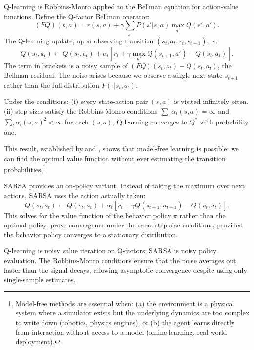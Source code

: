 Q-learning \citep{WatkinsDayan1992} is Robbins-Monro applied to the Bellman equation for action-value functions. Define the Q-factor Bellman operator:
\begin{equation}
(FQ)(s,a) = r(s,a) + \gamma \sum_{s'} P(s'|s,a) \max_{a'} Q(s',a').
\end{equation}
The Q-learning update, upon observing transition $(s_t, a_t, r_t, s_{t+1})$, is:
\begin{equation}
Q(s_t, a_t) \leftarrow Q(s_t, a_t) + \alpha_t \left[ r_t + \gamma \max_{a'} Q(s_{t+1}, a') - Q(s_t, a_t) \right].
\label{eq:qlearning}
\end{equation}
The term in brackets is a noisy sample of $(FQ)(s_t, a_t) - Q(s_t, a_t)$, the Bellman residual. The noise arises because we observe a single next state $s_{t+1}$ rather than the full distribution $P(\cdot|s_t, a_t)$.

\begin{theorem}
\label{thm:qlearning}
Under the conditions: (i) every state-action pair $(s,a)$ is visited infinitely often, (ii) step sizes satisfy the Robbins-Monro conditions $\sum_t \alpha_t(s,a) = \infty$ and $\sum_t \alpha_t(s,a)^2 < \infty$ for each $(s,a)$, Q-learning converges to $Q^*$ with probability one.
\end{theorem}

This result, established by \citet{WatkinsDayan1992} and \citet{jaakkola1994}, shows that model-free learning is possible: we can find the optimal value function without ever estimating the transition probabilities.\footnote{Model-free methods are essential when: (a) the environment is a physical system where a simulator exists but the underlying dynamics are too complex to write down (robotics, physics engines), or (b) the agent learns directly from interaction without access to a model (online learning, real-world deployment).}

SARSA provides an on-policy variant. Instead of taking the maximum over next actions, SARSA uses the action actually taken:
\begin{equation}
Q(s_t, a_t) \leftarrow Q(s_t, a_t) + \alpha_t \left[ r_t + \gamma Q(s_{t+1}, a_{t+1}) - Q(s_t, a_t) \right].
\end{equation}
This solves for the value function of the behavior policy $\pi$ rather than the optimal policy. \citet{singh2000} prove convergence under the same step-size conditions, provided the behavior policy converges to a stationary distribution.

Q-learning is noisy value iteration on Q-factors; SARSA is noisy policy evaluation. The Robbins-Monro conditions ensure that the noise averages out faster than the signal decays, allowing asymptotic convergence despite using only single-sample estimates.

